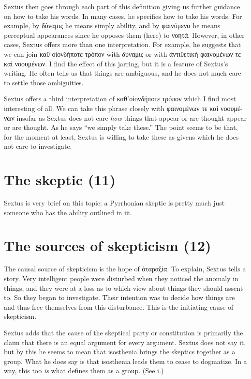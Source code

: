 Sextus then goes through each part of this definition giving us further guidance on how to take his words. In many cases, he specifies how to take his words. For example, by \textgreek{δύναμις} he means simply ability, and by \textgreek{φαινόμενα} he means perceptual appearances since he opposes them (here) to \textgreek{νοητά}. However, in other cases, Sextus offers more than one interpretation. For example, he suggests that we can join \textgreek{καθ᾽οἱονδήποτε τρόπον} with \textgreek{δύναμις} or with \textgreek{ἀντιθετικὴ φαινομένων τε καὶ νοουμένων}. I find the effect of this jarring, but it is a feature of Sextus's writing. He often tells us that things are ambiguous, and he does not much care to settle those ambiguities.

Sextus offers a third interpretation of \textgreek{καθ᾽οἱονδήποτε τρόπον} which I find most interesting of all. We can take this phrase closely with \textgreek{φαινομένων τε καὶ νοουμένων} insofar as Sextus does not care \textit{how} things that appear or are thought appear or are thought. As he says ``we simply take these.'' The point seems to be that, for the moment at least, Sextus is willing to take these as givens which he does not care to investigate.

\section{The skeptic (11)}

Sextus is very brief on this topic: a Pyrrhonian skeptic is pretty much just someone who has the ability outlined in iii.

\section{The sources of skepticism (12)}

The causal source of skepticism is the hope of \textgreek{ἀταραξία}. To explain, Sextus tells a story. Very intelligent people were disturbed when they noticed the anomaly in things, and they were at a loss as to which view about things they should assent to. So they began to investigate. Their intention was to decide how things are and thus free themselves from this disturbance. This is the initiating cause of skepticism.

Sextus adds that the cause of the skeptical party or constitution is primarily the claim that there is an equal argument for every argument. Sextus does not say it, but by this he seems to mean that \textgreek{isosthenia} brings the skeptics together as a group. What he does say is that \textgreek{isosthenia} leads them to cease to dogmatize. In a way, this too \textit{is} what defines them as a group. (See i.)


